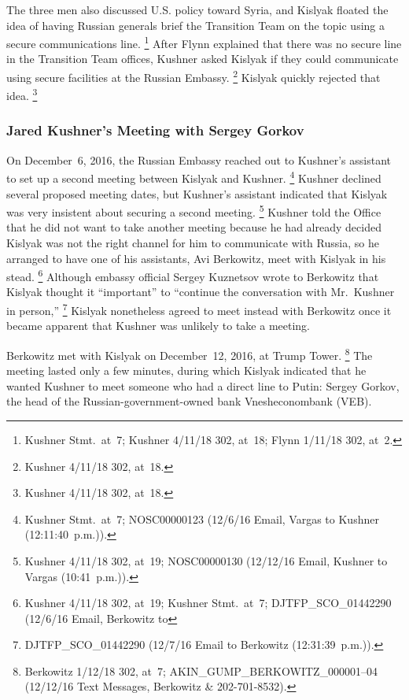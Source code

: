 The three men also discussed U.S. policy toward Syria, and Kislyak floated the idea of having Russian generals brief the Transition Team on the topic using a secure communications line.%
\footnote{Kushner Stmt.\ at~7;
Kushner 4/11/18 302, at~18;
Flynn 1/11/18 302, at~2.}
After Flynn explained that there was no secure line in the Transition Team offices, Kushner asked Kislyak if they could communicate using secure facilities at the Russian Embassy.%
\footnote{Kushner 4/11/18 302, at~18.}
Kislyak quickly rejected that idea.%
\footnote{Kushner 4/11/18 302, at~18.}

\subsubsection{Jared Kushner's Meeting with Sergey Gorkov}

On December~6, 2016, the Russian Embassy reached out to Kushner's assistant to set up a second meeting between Kislyak and Kushner.%
\footnote{Kushner Stmt.\ at~7;
NOSC00000123 (12/6/16 Email, Vargas to Kushner (12:11:40~p.m.)).}
Kushner declined several proposed meeting dates, but Kushner's assistant indicated that Kislyak was very insistent about securing a second meeting.%
\footnote{Kushner 4/11/18 302, at~19;
NOSC00000130 (12/12/16 Email, Kushner to Vargas (10:41~p.m.)).}
Kushner told the Office that he did not want to take another meeting because he had already decided Kislyak was not the right channel for him to communicate with Russia, so he arranged to have one of his assistants, Avi Berkowitz, meet with Kislyak in his stead.%
\footnote{Kushner 4/11/18 302, at~19;
Kushner Stmt.\ at~7;
DJTFP\_SCO\_01442290 (12/6/16 Email, Berkowitz to }
Although embassy official Sergey Kuznetsov wrote to Berkowitz that Kislyak thought it ``important'' to ``continue the conversation with Mr.~Kushner in person,''%
\footnote{DJTFP\_SCO\_01442290 (12/7/16 Email  to Berkowitz (12:31:39~p.m.)).}
Kislyak nonetheless agreed to meet instead with Berkowitz once it became apparent that Kushner was unlikely to take a meeting.

Berkowitz met with Kislyak on December~12, 2016, at Trump Tower.%
\footnote{Berkowitz 1/12/18 302, at~7;
AKIN\_GUMP\_BERKOWITZ\_000001--04 (12/12/16 Text Messages, Berkowitz \& 202-701-8532).}
The meeting lasted only a few minutes, during which Kislyak indicated that he wanted Kushner to meet someone who had a direct line to Putin: Sergey Gorkov, the head of the Russian-government-owned bank Vnesheconombank (VEB).

